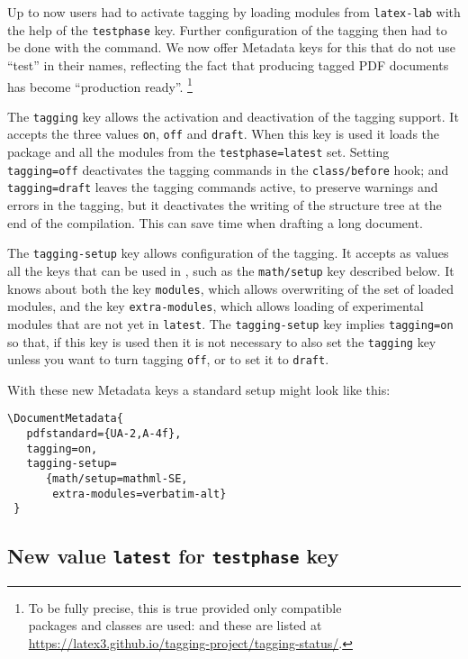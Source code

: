 \documentclass{ltnews}
\begin{document}
Up to now users had to activate tagging by loading modules from
\texttt{latex-lab} with the help of the \texttt{testphase}
key. Further configuration of the tagging then had to be done with the
 command.  We now offer Metadata keys for this 
that do not use
\enquote{test} in their names, reflecting the fact that producing
tagged PDF documents has become \enquote{production ready}.%
\footnote{To be fully precise, this is true provided
only compatible\\
packages and classes are used: and these are listed at\\
\url{https://latex3.github.io/tagging-project/tagging-status/}.}

The \texttt{tagging} key allows the activation and deactivation of the tagging
support.  It accepts the three values \texttt{on}, \texttt{off} and
\texttt{draft}.  When this key is used it loads the
 package and all the modules from the
\texttt{testphase=latest} set.  Setting \texttt{tagging=off} deactivates the
tagging commands in the 
\texttt{class/before} hook; and \texttt{tagging=draft} leaves the 
tagging commands active, to 
preserve warnings and errors in the tagging, but it deactivates
the writing of the structure tree at the end of the compilation. This
can save time when drafting a long document.

The \texttt{tagging-setup} key allows configuration of the tagging. It
accepts as values all the keys that can be used in ,
such as the \texttt{math/setup} key described below. It knows about both the
key \texttt{modules}, which allows overwriting of the set of loaded
modules, and the key \texttt{extra-modules}, which allows loading of
experimental modules that are not yet in \texttt{latest}. 
%
The \texttt{tagging-setup} key implies \texttt{tagging=on} so that, if
this key is used then it is not necessary to also set the \texttt{tagging}
key unless you want to turn tagging \texttt{off}, or to set it to
\texttt{draft}.

With these new Metadata keys a standard setup might look like this:
\begin{verbatim}
\DocumentMetadata{
   pdfstandard={UA-2,A-4f},
   tagging=on,
   tagging-setup=
      {math/setup=mathml-SE,
       extra-modules=verbatim-alt}
 }      
\end{verbatim}


\subsection{New value \texttt{latest} for \texttt{testphase} key}
\end{document}
